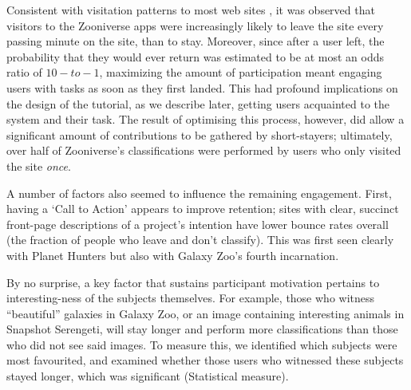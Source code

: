 \documentclass{sigchi}
\begin{document}
Consistent with visitation patterns to most web sites \cite{TODO}, it was observed that visitors to the Zooniverse apps were increasingly likely to leave the site every passing minute on the site, than to stay.  Moreover, since after a user left, the probability that they would ever return was estimated to be at most an odds ratio of $10-to-1$, maximizing the amount of participation meant engaging users with tasks as soon as they first landed.  This had profound implications on the design of the tutorial, as we describe later, getting users acquainted to the system and their task.  The result of optimising this process, however, did allow a significant amount of contributions to be gathered by short-stayers; ultimately, over half of Zooniverse's classifications were performed by users who only visited the site \emph{once}.


A number of factors also seemed to influence the remaining engagement.  First, having a `Call to Action' appears to improve retention; sites with clear, succinct front-page descriptions of a project's intention have lower bounce rates overall (the fraction of people who leave and don't classify). This was first seen clearly with Planet Hunters but also with Galaxy Zoo's fourth incarnation. %

By no surprise, a key factor that sustains participant motivation pertains to interesting-ness of the subjects themselves.  For example, those who witness ``beautiful'' galaxies in Galaxy Zoo, or an image containing interesting animals in Snapshot Serengeti, will stay longer and perform more classifications than those who did not see said images.  To measure this, we identified which subjects were most favourited, and examined whether those users who witnessed these subjects stayed longer, which was significant (Statistical measure). %
\end{document}
